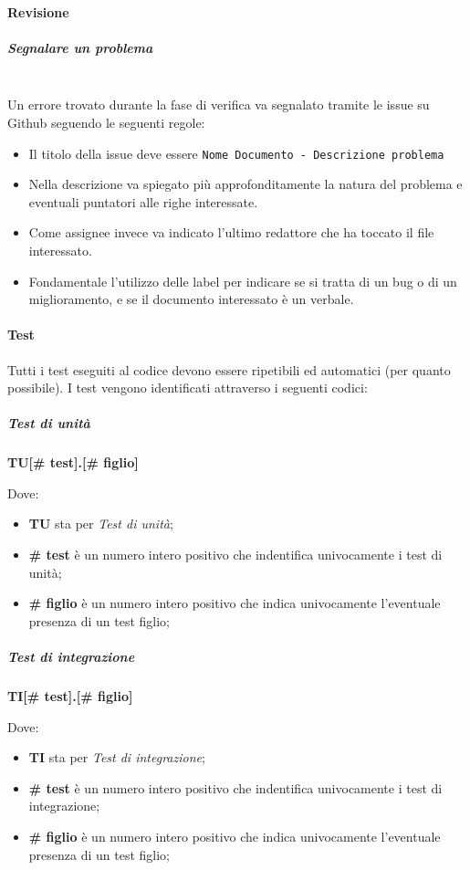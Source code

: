 \setlength\extrarowheight{0pt}

\newpage
\paragraph{Revisione}
\subparagraph{Segnalare un problema}
\mbox{}\\
Un errore trovato durante la fase di verifica va segnalato tramite le issue su Github
seguendo le seguenti regole:
\begin{itemize}
    \item Il titolo della issue deve essere
    \texttt{Nome Documento - Descrizione problema}
    \item Nella descrizione va spiegato più approfonditamente la natura del
    problema e eventuali puntatori alle righe interessate.
    \item  Come assignee invece va indicato l'ultimo redattore che ha toccato il file
    interessato.
    \item Fondamentale l'utilizzo delle label per indicare se si tratta
    di un bug o di un miglioramento, e se il documento interessato è un verbale.
\end{itemize}

\paragraph{Test}
Tutti i test eseguiti al codice devono essere ripetibili ed automatici (per quanto possibile).
I test vengono identificati attraverso i seguenti codici:
\subparagraph{Test di unità}
\begin{center}
    \textbf{TU[\# test].[\# figlio]}
\end{center}
Dove:
\begin{itemize}
    \item \textbf{TU} sta per \textit{Test di unità};
    \item \textbf{\# test} è un numero intero positivo che indentifica univocamente i test di unità;
    \item \textbf{\# figlio} è un numero intero positivo che indica univocamente l'eventuale presenza di un test figlio;
\end{itemize}

\subparagraph{Test di integrazione}
\begin{center}
    \textbf{TI[\# test].[\# figlio]}
\end{center}
Dove:
\begin{itemize}
    \item \textbf{TI} sta per \textit{Test di integrazione};
    \item \textbf{\# test} è un numero intero positivo che indentifica univocamente i test di integrazione;
    \item \textbf{\# figlio} è un numero intero positivo che indica univocamente l'eventuale presenza di un test figlio;
\end{itemize}

